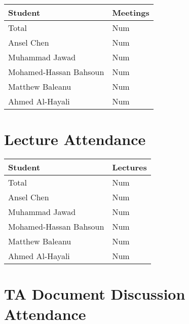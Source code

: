 \documentclass{article}
\begin{document}
\begin{table}[H]
\centering
\begin{tabular}{ll}
\toprule
\textbf{Student} & \textbf{Meetings}\\
\midrule
Total & Num\\
Ansel Chen & Num\\
Muhammad Jawad & Num\\
Mohamed-Hassan Bahsoun & Num\\
Matthew Baleanu & Num\\
Ahmed Al-Hayali & Num\\
\bottomrule
\end{tabular}
\end{table}


\section{Lecture Attendance}


\begin{table}[H]
\centering
\begin{tabular}{ll}
\toprule
\textbf{Student} & \textbf{Lectures}\\
\midrule
Total & Num\\
Ansel Chen & Num\\
Muhammad Jawad & Num\\
Mohamed-Hassan Bahsoun & Num\\
Matthew Baleanu & Num\\
Ahmed Al-Hayali & Num\\
\bottomrule
\end{tabular}
\end{table}


\section{TA Document Discussion Attendance}

\end{document}

